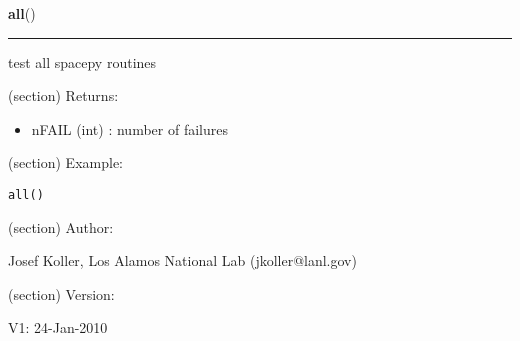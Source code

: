 \hspace{.8\funcindent}\begin{boxedminipage}{\funcwidth}

    \raggedright \textbf{all}()

    \vspace{-1.5ex}

    \rule{\textwidth}{0.5\fboxrule}
\setlength{\parskip}{2ex}
    test all spacepy routines

    (section) Returns:

      \begin{itemize}
      \setlength{\parskip}{0.6ex}
        \item nFAIL (int) : number of failures

      \end{itemize}

    (section) Example:

\begin{alltt}
\pysrcprompt{{\textgreater}{\textgreater}{\textgreater} }all()
\end{alltt}
    (section) Author:

      Josef Koller, Los Alamos National Lab (jkoller@lanl.gov)

    (section) Version:

      V1: 24-Jan-2010

\setlength{\parskip}{1ex}
    \end{boxedminipage}

    \label{spacepy:testing:ticktock}

    \vspace{0.5ex}

